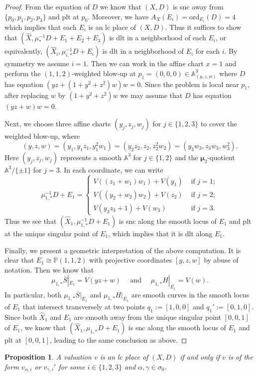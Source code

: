 \documentclass[reqno, 12pt]{amsart}
\newtheorem{prop}{Proposition}[section]
\theoremstyle{definition}
\newcommand{\bP}{\mathbb{P}}
\newcommand{\bA}{\mathbb{A}}
\newcommand{\hX}{\widehat{X}}
\newcommand{\ord}{\mathrm{ord}}
\newcommand{\bmu}{\boldsymbol{\mu}}
\newcommand{\oS}{\overline{S}}
\numberwithin{equation}{section}
\begin{document}
\begin{proof}
From the equation of $D$ we know that $(X,D)$ is snc away from $\{p_0,p_1,p_2,p_3\}$ and plt at $p_0$. Moreover, we have $A_X(E_i) = \ord_{E_i}(D) = 4$ which implies that each $E_i$ is an lc place of $(X,D)$. 
Thus it suffices to show that $(\hX, \mu_*^{-1}D+E_1+E_2+E_3)$ is dlt in a neighborhood of each $E_i$, or equivalently,  $(\hX_i, \mu_{i,*}^{-1} D+E_i)$ is dlt in a neighborhood of $E_i$ for each $i$. By symmetry we assume $i = 1$. Then we can work in the affine chart $x = 1$ and perform the $(1,1,2)$-weighted blow-up at $p_1=(0,0,0)\in \bA^3_{(y,z,w)}$ where $D$ has equation $(yz+ (1+y^2+z^2) w) w  = 0$. Since the problem is local near $p_1$, after replacing $w$ by $(1+y^2+z^2) w$ we may assume that $D$ has equation $(yz+w) w = 0$. 

Next, we choose three affine charts $(y_j, z_j, w_j)$ for $j\in \{1,2,3\}$ to cover the weighted blow-up, where 
\[
(y, z, w)  = (y_1, y_1 z_1, y_1^2 w_1) = (y_2 z_2, z_2, z_2^2 w_2) = (y_3 w_3, z_3 w_3,w_3^2). 
\]
Here $(y_j,z_j,w_j)$ represents a smooth $\bA^3$ for $j\in \{1,2\}$ and the $\bmu_2$-quotient $\bA^3/\{\pm 1\}$ for $j = 3$. In each coordinate, we can write
\[
\mu_{1,*}^{-1}D + E_1 = \begin{cases}
V((z_1 + w_1)w_1) + V(y_1) & \textrm{ if }j=1;\\
V((y_2 + w_2)w_2) + V(z_2) & \textrm{ if }j=2;\\
V(y_3 z_3 + 1) + V(w_3) & \textrm{ if }j=3.
\end{cases}
\]
Thus we see that $(\hX_1, \mu_{1,*}^{-1}D+E_1)$ is snc along the smooth locus of $E_1$ and plt at the unique singular point of $E_1$, which implies that it is dlt along $E_1$. 

Finally, we present a geometric interpretation of the above computation. It is clear that $E_1\cong \bP(1,1,2)$ with projective coordinates $[y,z,w]$ by abuse of notation. Then we know that 
\[
\mu_{1,*}\oS|_{E_1} = V(yz + w)\quad \textrm{ and }\quad \mu_{1,*}H|_{E_1}= V(w).
\]
In particular, both  $\mu_{1,*}\oS|_{E_1}$ and $\mu_{1,*}H|_{E_1}$ are smooth curves in the smooth locus of $E_1$ that intersect transversely at two points $q_1:=[1,0,0]$ and  $q_1':=[0,1,0]$. Since both $\hX_1$ and $E_1$ are smooth away from the unique singular point $[0,0,1]$ of $E_1$, we know that $(\hX_1, \mu_{1,*} D + E_1)$ is snc along the smooth locus of $E_1$ and plt at $[0,0,1]$, leading to the same conclusion as above.
\end{proof}

\begin{prop}\label{prop:LCP-Markov}
A valuation $v$ is an lc place of $(X,D)$ if and only if $v$ is of the form $v_{\alpha,i}$ or $v_{\gamma,i}'$ for some $i \in \{1,2,3\}$ and $\alpha,\gamma\in \sigma_0$. 
\end{prop}
\end{document}
